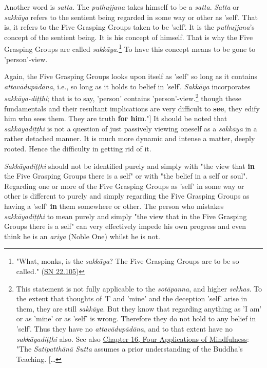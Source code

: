 Another word is \emph{satta}. The \emph{puthujjana} takes himself to be a \emph{satta}. \emph{Satta} or \emph{sakkāya} refers to the sentient being regarded in some way or other as 'self'. That is, it refers to the Five Grasping Groups taken to be 'self'. It is the \emph{puthujjana}'s concept of the sentient being. It is his concept of himself. That is why the Five Grasping Groups are called \emph{sakkāya}.\footnote{"What, monks, is the \emph{sakkāya}? The Five Grasping Groups are to be so called." (\href{https://suttacentral.net/sn22.105/en/sujato}{SN 22.105})} To have this concept means to be gone to 'person'-view.

Again, the Five Grasping Groups looks upon itself as 'self' so long as it contains \emph{attavādupādāna}, i.e., so long as it holds to belief in 'self'. \emph{Sakkāya} incorporates \emph{sakkāya-diṭṭhi}; that is to say, 'person' contains 'person'-view.\footnote{This statement is not fully applicable to the \emph{sotāpanna}, and higher \emph{sekhas}. To the extent that thoughts of 'I' and 'mine' and the deception 'self' arise in them, they are still \emph{sakkāya}. But they know that regarding anything as 'I am' or as 'mine' or as 'self' is wrong. Therefore they do not hold to any belief in 'self'. Thus they have no \emph{attavādupādāna}, and to that extent have no \emph{sakkāyadiṭṭhi} also. See also \href{ch-16-satipatthana.xml\#truth-for-him}{Chapter 16, Four Applications of Mindfulness}: "The \emph{Satipatthānā Sutta} assumes a prior understanding of the Buddha's Teaching. {[}\ldots\hspace{0pt}} though these fundamentals and their resultant implications are very difficult to \textbf{see}, they edify him who sees them. They are truth \textbf{for him}."{]} It should be noted that \emph{sakkāyadiṭṭhi} is not a question of just passively viewing oneself as a \emph{sakkāya} in a rather detached manner. It is much more dynamic and intense a matter, deeply rooted. Hence the difficulty in getting rid of it.

\emph{Sakkāyadiṭṭhi} should not be identified purely and simply with "the view that \textbf{in} the Five Grasping Groups there is a self" or with "the belief in a self or soul". Regarding one or more of the Five Grasping Groups as 'self' in some way or other is different to purely and simply regarding the Five Grasping Groups as having a 'self' \textbf{in} them somewhere or other. The person who mistakes \emph{sakkāyadiṭṭhi} to mean purely and simply "the view that in the Five Grasping Groups there is a self" can very effectively impede his own progress and even think he is an \emph{ariya} (Noble One) whilst he is not.

